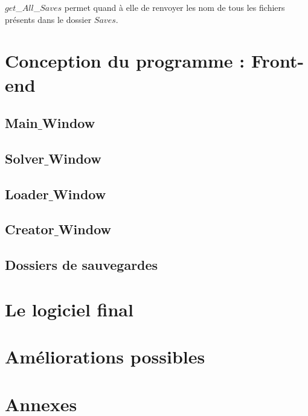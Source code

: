 \documentclass[12pt]{article}
\begin{document}
$get$\_$All$\_$Saves$ permet quand à elle de renvoyer les nom de tous les fichiers présents dans le dossier $Saves$.







\newpage
\section{Conception du programme : Front-end}

\subsection{Main$\_$Window}
\subsection{Solver$\_$Window}
\subsection{Loader$\_$Window}
\subsection{Creator$\_$Window}
\subsection{Dossiers de sauvegardes}

\section{Le logiciel final}
\section{Améliorations possibles}


\section{Annexes}
\end{document}
